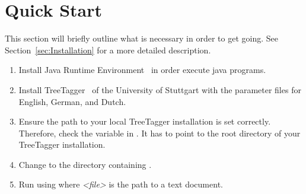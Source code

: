 \section{Quick Start}\label{sec:QuickStart}
This section will briefly outline what is necessary in order to get \product{} going. See Section~\ref{sec:Installation} for a more detailed description.
\begin{enumerate}
\item Install Java Runtime Environment~\cite{Java} in order execute java programs.
\item Install TreeTagger~\cite{TreeTagger} of the University of Stuttgart with the parameter files for English, German, and Dutch.
\item Ensure the path to your local TreeTagger installation is set correctly. Therefore, check the variable  in \configFile{}. It has to point to the root directory of your TreeTagger installation.
\item Change to the directory containing \executableFile{}.
\item Run \product{} using  where \emph{<file>} is the path to a text document.
\end{enumerate}

